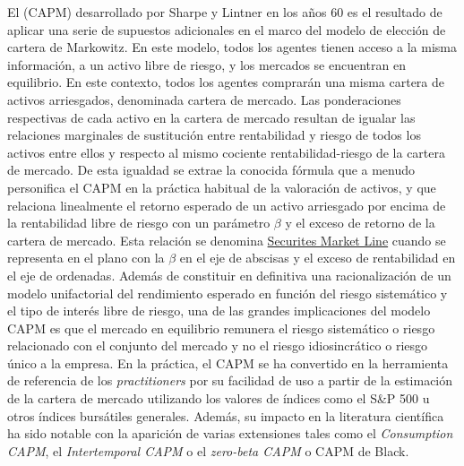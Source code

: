 \documentclass{nuevotema}
\begin{document}
El  (CAPM) desarrollado por Sharpe y Lintner en los años 60 es el resultado de aplicar una serie de supuestos adicionales en el marco del modelo de elección de cartera de Markowitz. En este modelo, todos los agentes tienen acceso a la misma información, a un activo libre de riesgo, y los mercados se encuentran en equilibrio. En este contexto, todos los agentes comprarán una misma cartera de activos arriesgados, denominada cartera de mercado. Las ponderaciones respectivas de cada activo en la cartera de mercado resultan de igualar las relaciones marginales de sustitución entre rentabilidad y riesgo de todos los activos entre ellos y respecto al mismo cociente rentabilidad-riesgo de la cartera de mercado. De esta igualdad se extrae la conocida fórmula que a menudo personifica el CAPM en la práctica habitual de la valoración de activos, y que relaciona linealmente el retorno esperado de un activo arriesgado por encima de la rentabilidad libre de riesgo con un parámetro $\beta$ y el exceso de retorno de la cartera de mercado. Esta relación se denomina \underline{Securites Market Line} cuando se representa en el plano con la $\beta$ en el eje de abscisas y el exceso de rentabilidad en el eje de ordenadas. Además de constituir en definitiva una racionalización de un modelo unifactorial del rendimiento esperado en función del riesgo sistemático y el tipo de interés libre de riesgo, una de las grandes implicaciones del modelo CAPM es que el mercado en equilibrio remunera el riesgo sistemático o riesgo relacionado con el conjunto del mercado y no el riesgo idiosincrático o riesgo único a la empresa. En la práctica, el CAPM se ha convertido en la herramienta de referencia de los \textit{practitioners} por su facilidad de uso a partir de la estimación de la cartera de mercado utilizando los valores de índices como el S\&P 500 u otros índices bursátiles generales. Además, su impacto en la literatura científica ha sido notable con la aparición de varias extensiones tales como el \textit{Consumption CAPM}, el \textit{Intertemporal CAPM} o el \textit{zero-beta CAPM} o CAPM de Black.
\end{document}
